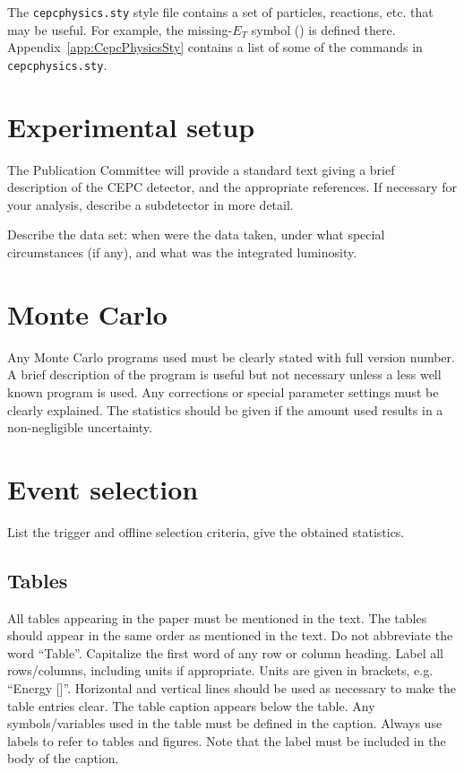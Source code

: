 \documentclass[11pt,a4paper]{cepcnote}
\begin{document}
The {\tt cepcphysics.sty} style file contains a set of particles,
reactions, etc. that may be useful. For example, the missing-$E_T$
symbol (\met{}) is defined there. Appendix~\ref{app:CepcPhysicsSty}
contains a list of some of the commands in {\tt cepcphysics.sty}.

\section{Experimental setup}

The Publication Committee will provide a standard text giving a brief
description of the CEPC detector, and the appropriate references.  If
necessary for your analysis, describe a subdetector in more detail.

Describe the data set: when were the data taken, under what special
circumstances (if any), and what was the integrated luminosity.

\section{Monte Carlo}

Any Monte Carlo programs used must be clearly stated with full version
number. A brief description of the program is useful but not necessary
unless a less well known program is used.  Any corrections or special
parameter settings must be clearly explained.  The statistics should
be given if the amount used results in a non-negligible uncertainty.

\section{Event selection}

List the trigger and offline selection criteria, give the obtained
statistics.

\subsection{Tables}

All tables appearing in the paper must be mentioned in the text. The
tables should appear in the same order as mentioned in the text. Do
not abbreviate the word ``Table''. Capitalize the first word of any
row or column heading. Label all rows/columns, including units if
appropriate. Units are given in brackets, e.g. ``Energy [\gev]''.
Horizontal and vertical lines should be used as necessary to make the
table entries clear. 
The table caption appears below the table.  
Any symbols/variables used in the table must be defined in the
caption.  Always use labels to refer to tables and figures. Note that
the label must be included in the body of the caption.
\end{document}
